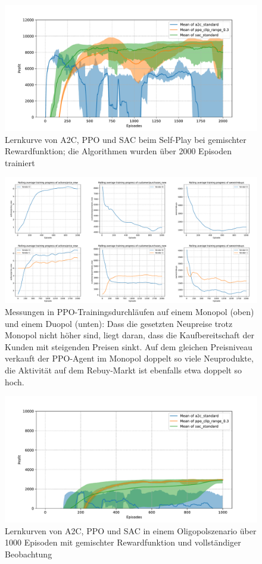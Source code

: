 \begin{figure}[htb]
	\centering
	\includegraphics[width=\textwidth]{appendix/self_play_mixed.pdf}
	\caption{Lernkurve von A2C, PPO und SAC beim Self-Play bei gemischter Rewardfunktion; die Algorithmen wurden über 2000 Episoden trainiert}
	\label{graphic:SelfPlayMixedLearningCurve}
\end{figure}
\begin{figure}[htb]
	\centering
	\includegraphics[width=\textwidth]{appendix/ppo_monopoly_vs_doupoly.pdf}
	\caption{
		Messungen in PPO-Trainingsdurchläufen auf einem Monopol (oben) und einem Duopol (unten):
		Dass die gesetzten Neupreise trotz Monopol nicht höher sind, liegt daran, dass die Kaufbereitschaft der Kunden mit steigenden Preisen sinkt.
		Auf dem gleichen Preisniveau verkauft der PPO-Agent im Monopol doppelt so viele Neuprodukte, die Aktivität auf dem Rebuy-Markt ist ebenfalls etwa doppelt so hoch.
	}
	\label{graphic:PPOMonopolyDuopoly}
\end{figure}
\begin{figure}[htb]
	\centering
	\includegraphics[width=\textwidth]{appendix/comparison_oligopoly_mixed.pdf}
	\caption{Lernkurven von A2C, PPO und SAC in einem Oligopolszenario über 1000 Episoden mit gemischter Rewardfunktion und vollständiger Beobachtung}
	\label{graphic:OligopolyMixedComparison}
\end{figure}